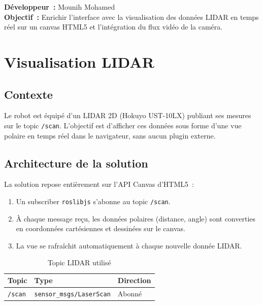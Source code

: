 \documentclass[12pt,a4paper]{report}
\begin{document}
\begin{tcolorbox}[colback=primary!10,colframe=primary]
\textbf{Développeur~:} Mounih Mohamed \\
\textbf{Objectif~:} Enrichir l'interface avec la visualisation des données LIDAR en temps réel sur un canvas HTML5 et l'intégration du flux vidéo de la caméra.
\end{tcolorbox}

\section{Visualisation LIDAR}

\subsection{Contexte}

Le robot est équipé d'un LIDAR 2D (Hokuyo UST-10LX) publiant ses mesures sur le topic \texttt{/scan}. L'objectif est d'afficher ces données sous forme d'une vue polaire en temps réel dans le navigateur, sans aucun plugin externe.

\subsection{Architecture de la solution}

La solution repose entièrement sur l'API Canvas d'HTML5~:

\begin{enumerate}
  \item Un subscriber \texttt{roslibjs} s'abonne au topic \texttt{/scan}.
  \item À chaque message reçu, les données polaires (distance, angle) sont converties en coordonnées cartésiennes et dessinées sur le canvas.
  \item La vue se rafraîchit automatiquement à chaque nouvelle donnée LIDAR.
\end{enumerate}

\begin{table}[H]
\centering
\begin{tabularx}{\textwidth}{lll}
\toprule
\textbf{Topic} & \textbf{Type} & \textbf{Direction} \\
\midrule
\texttt{/scan} & \texttt{sensor\_msgs/LaserScan} & Abonné \\
\bottomrule
\end{tabularx}
\caption{Topic LIDAR utilisé}
\end{table}
\end{document}
